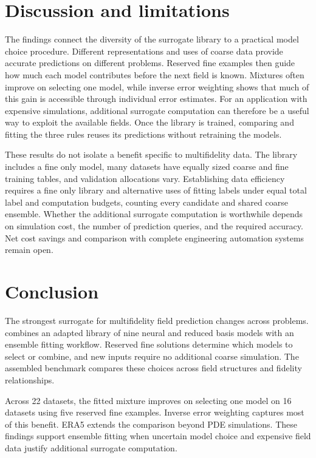 \section{Discussion and limitations}
\label{sec:discussion}
The findings connect the diversity of the surrogate library to a practical
model choice procedure. Different representations and uses of coarse data
provide accurate predictions on different problems. Reserved fine examples
then guide how much each model contributes before the next field is known.
Mixtures often improve on selecting one model, while inverse error weighting
shows that much of this gain is accessible through individual error estimates.
For an application with expensive simulations, additional surrogate computation
can therefore be a useful way to exploit the available fields. Once the library
is trained, comparing and fitting the three rules reuses its predictions without
retraining the models.

These results do not isolate a benefit specific to multifidelity data. The library includes
a fine only model, many datasets have equally sized coarse and fine training
tables, and validation allocations vary. Establishing data efficiency requires a
fine only library and alternative uses of fitting labels under equal total
label and computation budgets, counting every candidate and shared coarse
ensemble. Whether the additional surrogate computation is worthwhile depends
on simulation cost, the number of prediction queries, and the required accuracy.
Net cost savings and comparison with complete engineering automation systems
remain open.

\section{Conclusion}
The strongest surrogate for multifidelity field prediction changes across
problems. \method{} combines an adapted library of nine neural and reduced
basis models with an ensemble fitting workflow. Reserved fine solutions
determine which models to select or combine, and new inputs require no
additional coarse simulation. The assembled benchmark compares these choices
across field structures and fidelity relationships.

Across 22 datasets, the fitted mixture improves on selecting one model on 16
datasets using five reserved fine examples. Inverse error weighting captures most of this benefit.
ERA5 extends the comparison beyond PDE simulations. These findings support ensemble
fitting when uncertain model choice and expensive field data justify additional
surrogate computation.
